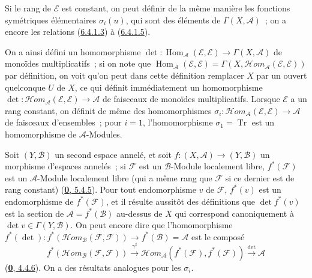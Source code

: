 \begin{env}[6.4.8]
Si le rang de $\mathcal{E}$ est constant, on peut définir de la même manière
les fonctions symétriques élémentaires $\sigma_i(u)$, qui sont des éléments
de $\Gamma(X,\mathcal{A})$~; on a encore les relations
(\hyperref[II.6.4.1.3-fr]{6.4.1.3}) à
(\hyperref[II.6.4.1.5-fr]{6.4.1.5}).


On a ainsi défini un homomorphisme
$\det:\operatorname{Hom}_{\mathcal{A}}(\mathcal{E},\mathcal{E})
\to\Gamma(X,\mathcal{A})$ de monoïdes multiplicatifs~; si on note que
$\operatorname{Hom}_{\mathcal{A}}(\mathcal{E},\mathcal{E})=
\Gamma(X,\mathcal{H}om_{\mathcal{A}}(\mathcal{E},\mathcal{E}))$ par
définition, on voit qu'on peut dans cette définition remplacer $X$ par un
ouvert quelconque $U$ de $X$, ce qui définit immédiatement un homomorphisme
$\det:\mathcal{H}om_{\mathcal{A}}(\mathcal{E},\mathcal{E})\to\mathcal{A}$ de
faisceaux de monoïdes multiplicatifs. Lorsque $\mathcal{E}$ a un rang
constant, on définit de même des homomorphismes
$\sigma_i:\mathcal{H}om_{\mathcal{A}}(\mathcal{E},\mathcal{E})
\to\mathcal{A}$ de faisceaux d'ensembles~; pour $i=1$, l'homomorphisme
$\sigma_1=\operatorname{Tr}$ est un homomorphisme de $\mathcal{A}$-Modules.

Soit $(Y,\mathcal{B})$ un second espace annelé, et soit
$f:(X,\mathcal{A})\to(Y,\mathcal{B})$ un morphisme d'espaces annelés~; si
$\mathcal{F}$ est un $\mathcal{B}$-Module localement libre,
$f^*(\mathcal{F})$ est un $\mathcal{A}$-Module localement libre (qui a même
rang que $\mathcal{F}$ si ce dernier est de rang constant)
(\hyperref[0.5.4.5-fr]{\textbf{0}, 5.4.5}). Pour tout endomorphisme $v$ de
$\mathcal{F}$, $f^*(v)$ est un endomorphisme de $f^*(\mathcal{F})$, et il
résulte aussitôt des définitions que $\det f^*(v)$ est la section de
$\mathcal{A}=f^*(\mathcal{B})$ au-dessus de $X$ qui correspond canoniquement
à $\det v\in\Gamma(Y,\mathcal{B})$. On peut encore dire que l'homomorphisme
$f^*(\det):f^*(\mathcal{H}om_{\mathcal{B}}(\mathcal{F},\mathcal{F}))
\to f^*(\mathcal{B})=\mathcal{A}$ est le composé
\[
f^*(\mathcal{H}om_{\mathcal{B}}(\mathcal{F},\mathcal{F}))
\xrightarrow{\gamma^\sharp}
\mathcal{H}om_{\mathcal{A}}(f^*(\mathcal{F}),f^*(\mathcal{F}))
\xrightarrow{\det}\mathcal{A}
\]
(\hyperref[0.4.4.6-fr]{\textbf{0}, 4.4.6}). On a des résultats analogues pour les
$\sigma_i$.
\end{env}

